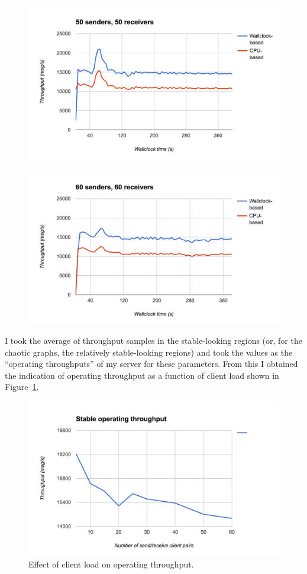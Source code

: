 \begin{figure}
  \centering\includegraphics[width=\textwidth]{../transcripts/lipsum/50n50/graph.png}
\end{figure}
\begin{figure}
  \centering\includegraphics[width=\textwidth]{../transcripts/lipsum/60n60/graph.png}
\end{figure}

I took the average of throughput samples in the stable-looking regions (or, for the chaotic graphs, the relatively stable-looking regions) and took the values as the ``operating throughputs'' of my server for these parameters. From this I obtained the indication of operating throughput as a function of client load shown in Figure~\ref{fig:summary}.

\begin{figure}
  \centering\includegraphics[width=\textwidth]{../transcripts/lipsum/throughp_clients.png}
  \caption{Effect of client load on operating throughput.}
  \label{fig:summary}
\end{figure}
